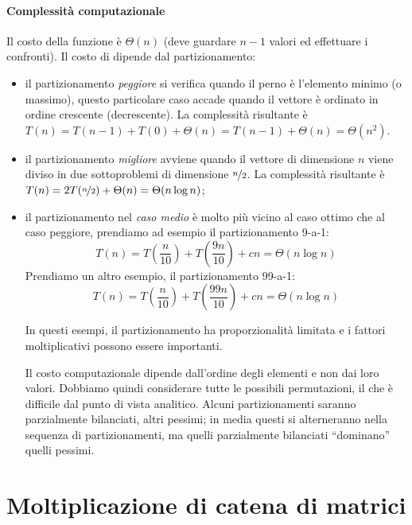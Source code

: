 \paragraph{Complessità computazionale}
Il costo della funzione \pivot è \(\Theta(n)\) (deve guardare \(n-1\) valori ed effettuare i confronti).
Il costo di \quickSort dipende dal partizionamento:
\begin{itemize}
	\item il partizionamento \emph{peggiore} si verifica quando il perno è l'elemento minimo (o massimo), questo particolare caso accade quando il vettore è ordinato in ordine crescente (decrescente).
	La complessità risultante è \(T(n) = T(n-1) + T(0) + \Theta(n) = T(n-1) + \Theta(n) = \Theta(n^2)\).
	\item il partizionamento \emph{migliore} avviene quando il vettore di dimensione \(n\) viene diviso in due sottoproblemi di dimensione \(\nicefrac{n}{2}\).
	La complessità risultante è \(T(n) = 2T(\nicefrac{n}{2}) + \Theta(n) = \Theta(n \log n)\);
	\item il partizionamento nel \emph{caso medio} è molto più vicino al caso ottimo che al caso peggiore, prendiamo ad esempio il partizionamento 9-a-1:
	\begin{equation*}
		T(n) = T\left(\frac{n}{10}\right) + T\left(\frac{9n}{10}\right) + cn = \Theta(n \log n)
	\end{equation*}
	Prendiamo un altro esempio, il partizionamento 99-a-1:
	\begin{equation*}
		T(n) = T\left(\frac{n}{10}\right) + T\left(\frac{99n}{10}\right) + cn = \Theta(n \log n)
	\end{equation*}
	\begin{note}
	In questi esempi, il partizionamento ha proporzionalità limitata e i fattori moltiplicativi possono essere importanti.
	\end{note}
	Il costo computazionale dipende dall'ordine degli elementi e non dai loro valori.
	Dobbiamo quindi considerare tutte le possibili permutazioni, il che è difficile dal punto di vista analitico.
	Alcuni partizionamenti saranno parzialmente bilanciati, altri pessimi; in media questi si alterneranno nella sequenza di partizionamenti, ma quelli parzialmente bilanciati \enquote{dominano} quelli pessimi.
\end{itemize}

\section*{Moltiplicazione di catena di matrici}


